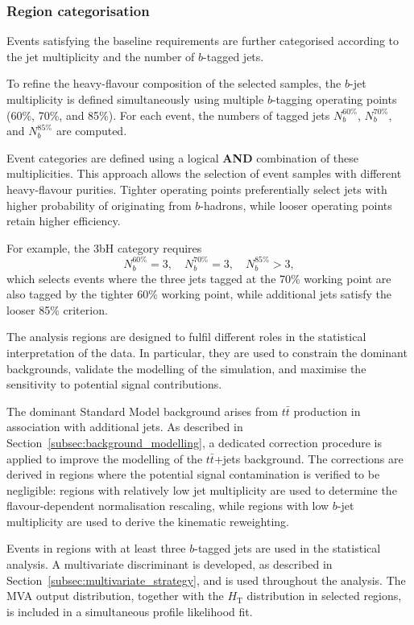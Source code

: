 \subsubsection{Region categorisation}

Events satisfying the baseline requirements are further
categorised according to the jet multiplicity and the number
of $b$-tagged jets.

To refine the heavy-flavour composition of the selected
samples, the $b$-jet multiplicity is defined simultaneously
using multiple $b$-tagging operating points (60\%, 70\%, and 85\%).
For each event, the numbers of tagged jets
$N_b^{60\%}$, $N_b^{70\%}$, and $N_b^{85\%}$
are computed.

Event categories are defined using a logical \textbf{AND}
combination of these multiplicities.
This approach allows the selection of event samples
with different heavy-flavour purities.
Tighter operating points preferentially select jets
with higher probability of originating from $b$-hadrons,
while looser operating points retain higher efficiency.

For example, the 3bH category requires
\[
N_b^{60\%} = 3, \quad
N_b^{70\%} = 3, \quad
N_b^{85\%} > 3 ,
\]
which selects events where the three jets tagged at the
70\% working point are also tagged by the tighter 60\%
working point, while additional jets satisfy the looser
85\% criterion.

The analysis regions are designed to fulfil different roles in the
statistical interpretation of the data. In particular, they are used
to constrain the dominant backgrounds, validate the modelling of the
simulation, and maximise the sensitivity to potential signal
contributions.

The dominant Standard Model background arises from $t\bar{t}$ production
in association with additional jets. As described in
Section~\ref{subsec:background_modelling}, a dedicated correction procedure is applied
to improve the modelling of the $t\bar{t}$+jets background.
The corrections are derived in regions where the potential
signal contamination is verified to be negligible: regions with
relatively low jet multiplicity are
used to determine the flavour-dependent normalisation rescaling,
while regions with low $b$-jet multiplicity are used to derive the
kinematic reweighting.

Events in regions with at least three $b$-tagged jets are used in the
statistical analysis. A multivariate discriminant is developed,
as described in Section~\ref{subsec:multivariate_strategy}, and is used
throughout the analysis. The MVA output distribution, together with the
$H_\mathrm{T}$ distribution in selected regions, is included in a
simultaneous profile likelihood fit.

